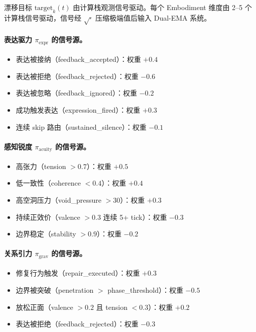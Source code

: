\documentclass[11pt]{article}
\begin{document}
漂移目标 $\text{target}_k(t)$ 由计算栈观测信号驱动。每个 Embodiment 维度由 2--5 个计算栈信号驱动，信号经 $\sqrt{\cdot}$ 压缩极端值后输入 Dual-EMA 系统。

\paragraph{表达驱力 $\pi_{\text{expr}}$ 的信号源。}
\begin{itemize}
\item 表达被接纳（feedback\_accepted）：权重 $+0.4$
\item 表达被拒绝（feedback\_rejected）：权重 $-0.6$
\item 表达被忽略（feedback\_ignored）：权重 $-0.2$
\item 成功触发表达（expression\_fired）：权重 $+0.3$
\item 连续 skip 路由（sustained\_silence）：权重 $-0.1$
\end{itemize}

\paragraph{感知锐度 $\pi_{\text{acuity}}$ 的信号源。}
\begin{itemize}
\item 高张力（tension $> 0.7$）：权重 $+0.5$
\item 低一致性（coherence $< 0.4$）：权重 $+0.4$
\item 高空洞压力（void\_pressure $> 30$）：权重 $+0.3$
\item 持续正效价（valence $> 0.3$ 连续 5+ tick）：权重 $-0.3$
\item 边界稳定（stability $> 0.9$）：权重 $-0.2$
\end{itemize}

\paragraph{关系引力 $\pi_{\text{grav}}$ 的信号源。}
\begin{itemize}
\item 修复行为触发（repair\_executed）：权重 $+0.3$
\item 边界被突破（penetration $>$ phase\_threshold）：权重 $-0.5$
\item 放松正面（valence $> 0.2$ 且 tension $< 0.3$）：权重 $+0.2$
\item 表达被拒绝（feedback\_rejected）：权重 $-0.3$
\end{itemize}
\end{document}
